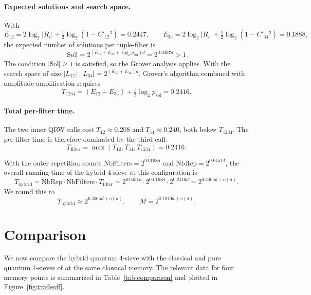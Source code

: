 \documentclass[10pt,a4paper]{article}
\begin{document}
\paragraph{Expected solutions and search space.}
With
\[
E_{12} = 2\log_{2}|R_i| + \tfrac{1}{2}\log_2(1-C'_{12}{}^{2}) = 0.2447,
\qquad
E_{34} = 2\log_{2}|R_i| + \tfrac{1}{2}\log_2(1-C'_{34}{}^{2}) = 0.1888,
\]
the expected number of solutions per tuple-filter is
\[
|\mathrm{Sol}| = 2^{(E_{12}+E_{34}+\log_2 p_{\mathrm{sol}})d}
= 2^{0.0497d} > 1.
\]
The condition \(|\mathrm{Sol}| \ge 1\) is satisfied, so the Grover
analysis applies. With the search space of size
\(|L_{12}|\cdot|L_{34}| = 2^{(E_{12}+E_{34})d}\), Grover's algorithm
combined with amplitude amplification requires
\begin{equation}
T_{1234}
= (E_{12}+E_{34}) + \tfrac{1}{2}\log_{2}p_{\mathrm{sol}}
= 0.2416.
\label{eq:T1234}
\end{equation}

\paragraph{Total per-filter time.}
The two inner QRW calls cost \(T_{12} \approx 0.208\) and
\(T_{34} \approx 0.240\), both below \(T_{1234}\). The per-filter
time is therefore dominated by the third call:
\[
T_{\text{filter}} = \max(T_{12}, T_{34}, T_{1234}) = 0.2416.
\]

With the outer repetition counts
\(\mathrm{NbFilters} = 2^{0.0198d}\) and
\(\mathrm{NbRep} = 2^{0.0451d}\), the overall running time of the hybrid
4-sieve at this configuration is
\begin{equation}
T_{\text{hybrid}}
= \mathrm{NbRep}\cdot \mathrm{NbFilters}\cdot T_{\text{filter}}
= 2^{0.0451d}\cdot 2^{0.0198d}\cdot 2^{0.2416d}
= 2^{0.3065d+o(d)}.
\label{eq:Thybrid}
\end{equation}
We round this to
\[
\boxed{T_{\text{hybrid}} \approx 2^{0.3065d+o(d)},\qquad M = 2^{0.1810d+o(d)}.}
\]

\section{Comparison}
\label{sec:comparison}

We now compare the hybrid quantum 4-sieve with the classical and pure
quantum 4-sieves of \cite{CL23} at the same classical memory. The
relevant data for four memory points is summarized in
Table~\ref{tab:comparison} and plotted in Figure~\ref{fig:tradeoff}.
\end{document}
